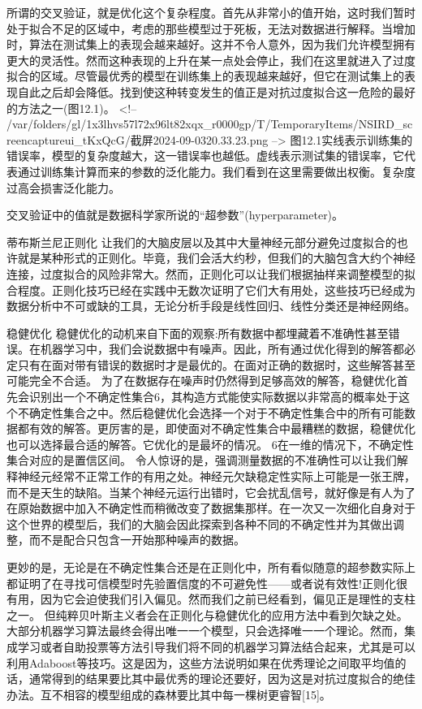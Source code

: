 所谓的交叉验证，就是优化这个复杂程度。首先从非常小的值开始，这时我们暂时处于拟合不足的区域中，考虑的那些模型过于死板，无法对数据进行解释。当增加时，算法在测试集上的表现会越来越好。这并不令人意外，因为我们允许模型拥有更大的灵活性。然而这种表现的上升在某一点处会停止，我们在这里就进入了过度拟合的区域。尽管最优秀的模型在训练集上的表现越来越好，但它在测试集上的表现自此之后却会降低。找到使这种转变发生的值正是对抗过度拟合这一危险的最好的方法之一(图12.1)。
<!-- /var/folders/gl/1x3lhvs57l72x96lt82xqx_r0000gp/T/TemporaryItems/NSIRD_screencaptureui_tKxQcG/截屏2024-09-0320.33.23.png -->
图12.1实线表示训练集的错误率，模型的复杂度越大，这一错误率也越低。虚线表示测试集的错误率，它代表通过训练集计算而来的参数的泛化能力。我们看到在这里需要做出权衡。复杂度过高会损害泛化能力。

交叉验证中的值就是数据科学家所说的“超参数”(hyperparameter)。

蒂布斯兰尼正则化
让我们的大脑皮层以及其中大量神经元部分避免过度拟合的也许就是某种形式的正则化。毕竟，我们会活大约秒，但我们的大脑包含大约个神经连接，过度拟合的风险非常大。然而，正则化可以让我们根据抽样来调整模型的拟合程度。正则化技巧已经在实践中无数次证明了它们大有用处，这些技巧已经成为数据分析中不可或缺的工具，无论分析手段是线性回归、线性分类还是神经网络。

稳健优化
稳健优化的动机来自下面的观察:所有数据中都埋藏着不准确性甚至错误。在机器学习中，我们会说数据中有噪声。因此，所有通过优化得到的解答都必定只有在面对带有错误的数据时才是最优的。在面对正确的数据时，这些解答甚至可能完全不合适。
为了在数据存在噪声时仍然得到足够高效的解答，稳健优化首先会识别出一个不确定性集合6，其构造方式能使实际数据以非常高的概率处于这个不确定性集合之中。然后稳健优化会选择一个对于不确定性集合中的所有可能数据都有效的解答。更厉害的是，即使面对不确定性集合中最糟糕的数据，稳健优化也可以选择最合适的解答。它优化的是最坏的情况。
6在一维的情况下，不确定性集合对应的是置信区间。
令人惊讶的是，强调测量数据的不准确性可以让我们解释神经元经常不正常工作的有用之处。神经元欠缺稳定性实际上可能是一张王牌，而不是天生的缺陷。当某个神经元运行出错时，它会扰乱信号，就好像是有人为了在原始数据中加入不确定性而稍微改变了数据集那样。在一次又一次细化自身对于这个世界的模型后，我们的大脑会因此探索到各种不同的不确定性并为其做出调整，而不是配合只包含一开始那种噪声的数据。

更妙的是，无论是在不确定性集合还是在正则化中，所有看似随意的超参数实际上都证明了在寻找可信模型时先验置信度的不可避免性——或者说有效性!正则化很有用，因为它会迫使我们引入偏见。然而我们之前已经看到，偏见正是理性的支柱之一。
但纯粹贝叶斯主义者会在正则化与稳健优化的应用方法中看到欠缺之处。大部分机器学习算法最终会得出唯一一个模型，只会选择唯一一个理论。然而，集成学习或者自助投票等方法引导我们将不同的机器学习算法结合起来，尤其是可以利用Adaboost等技巧。这是因为，这些方法说明如果在优秀理论之间取平均值的话，通常得到的结果要比其中最优秀的理论还要好，因为这是对抗过度拟合的绝佳办法。互不相容的模型组成的森林要比其中每一棵树更睿智[15]。

